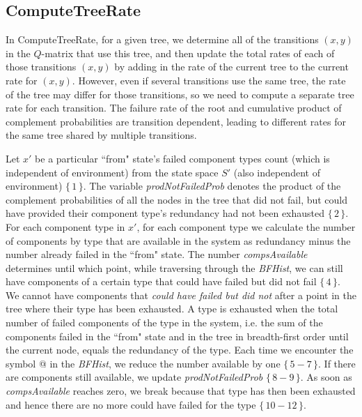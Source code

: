 \documentclass[12pt]{article}
\newcommand{\citeLine}[1]{$\{\,#1\,\}$}
\newcommand{\citeBlock}[2]{$\{\,#1 - #2\,\}$}
\begin{document}
\subsection{ComputeTreeRate}

In ComputeTreeRate, for a given tree, we determine all of the transitions $(x,y)$ in the $Q$-matrix that use this tree, and then update  the total rates of each of those transitions $(x,y)$ by adding in the rate of the current tree to the current rate for $(x,y)$. However, even if several transitions use the same tree, the rate of the tree may differ for those transitions, so we need to compute a separate tree rate for each transition. The failure rate of the root and cumulative product of complement probabilities are transition dependent, leading to different rates for the same tree shared by multiple transitions.

Let $x'$ be a particular ``from" state's failed component types count (which is independent of environment) from the state space $S'$ (also independent of environment) \citeLine{1}. The variable \textit{prodNotFailedProb} denotes the product of the complement probabilities of all the nodes in the tree that did not fail, but could have provided their component type's redundancy had not been exhausted \citeLine{2}. For each component type in $x'$, for each component type we calculate the number of components by type that are available in the system as redundancy minus the number already failed in the ``from" state. The number \textit{compsAvailable} determines until which point, while traversing through the \textit{BFHist}, we can still have components of a certain type that could have failed but did not fail \citeLine{4}. We cannot have components that \textit{could have failed but did not} after a point in the tree where their type has been exhausted. A type is exhausted when the total number of failed components of the type in the system, i.e. the sum of the components failed in the ``from" state and in the tree in breadth-first order until the current node, equals the redundancy of the type. Each time we encounter the symbol @ in the \textit{BFHist}, we reduce the number available by one \citeBlock{5}{7}. If there are components still available, we update \textit{prodNotFailedProb} \citeBlock{8}{9}. As soon as \textit{compsAvailable} reaches zero, we break because that type has then been exhausted and hence there are no more could have failed for the type \citeBlock{10}{12}.
\end{document}
